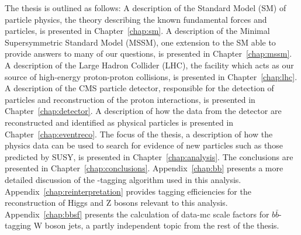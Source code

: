 The thesis is outlined as follows: A description of the Standard Model (SM) of particle physics, the theory describing the known fundamental forces and particles, is presented in Chapter~\ref{chap:sm}. A description of the Minimal Supersymmetric Standard Model (MSSM), one extension to the SM able to provide answers to many of our questions, is presented in Chapter~\ref{chap:mssm}. A description of the Large Hadron Collider (LHC), the facility which acts as our source of high-energy proton-proton collisions, is presented in Chapter~\ref{chap:lhc}. A description of the CMS particle detector, responsible for the detection of particles and reconstruction of the proton interactions, is presented in Chapter~\ref{chap:detector}. A description of how the data from the detector are reconstructed and identified as physical particles is presented in Chapter~\ref{chap:eventreco}. The focus of the thesis, a description of how the physics data can be used to search for evidence of new particles such as those predicted by SUSY, is presented in Chapter~\ref{chap:analysis}. The conclusions are presented in Chapter~\ref{chap:conclusions}. Appendix~\ref{chap:bb} presents a more detailed discussion of the \bbbar-tagging algorithm used in this analysis. Appendix~\ref{chap:reinterpretation} provides tagging efficiencies for the reconstruction of Higgs and Z bosons relevant to this analysis. Appendix~\ref{chap:bbsf} presents the calculation of data-mc scale factors for $b\bar{b}$-tagging W boson jets, a partly independent topic from the rest of the thesis.
